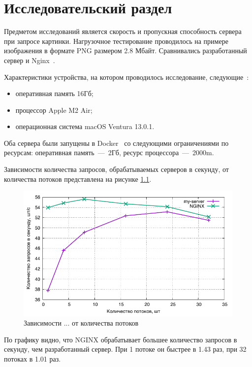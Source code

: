 \chapter{Исследовательский раздел}

Предметом исследований является скорость и пропускная способность сервера при запросе картинки. Нагрузочное тестирование проводилось на примере изображения в формате PNG размером 2.8 Мбайт. Сравнивались разработанный сервер и Nginx~\cite{dejonghe2020nginx}.

Характеристики устройства, на котором проводилось исследование, следующие~\cite{macbook}:

\begin{itemize}
 \item оперативная память 16Гб;
 \item процессор Apple M2 Air;
 \item операционная система macOS Ventura 13.0.1.
\end{itemize}

Оба сервера были запущены в Docker~\cite{docker} со следующими ограничениями по ресурсам: оперативная память~---~2Гб, ресурс процессора~---~2000m.

Зависимости количества запросов, обрабатываемых серверов в секунду, от количества потоков представлена на рисунке \ref{img:plot}.

\begin{figure}[h!]
    \centering
    \includegraphics[scale=0.8]{assets/plot.pdf}
    \caption{Зависимости ... от количества потоков}
    \label{img:plot}
\end{figure}

По графику видно, что NGINX обрабатывает большее количество запросов в секунду, чем разработанный сервер. При 1 потоке он быстрее в 1.43 раз, при 32 потоках в 1.01 раз.